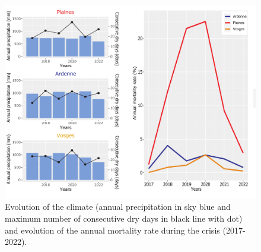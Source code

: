 \documentclass[3p,procedia]{elsarticle}
\begin{document}
\begin{figure}[htbp] 
   \centering
   \includegraphics[width=0.9 \textwidth]{figure_climat_result.png}
    \caption{Evolution of the climate (annual precipitation in sky blue and  maximum number of consecutive dry days in black line with dot) and evolution of the annual mortality rate during the crisis (2017-2022).}
    \label{evol_gen}
\end{figure}

    
\end{document}

